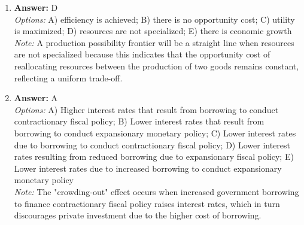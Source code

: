 \documentclass[12pt]{article}
\begin{document}
\begin{enumerate}[label=\arabic*.]
\item \textbf{Answer:} D
\\ \textit{Options:} A) efficiency is achieved; B) there is no opportunity cost; C) utility is maximized; D) resources are not specialized; E) there is economic growth
\\ \textit{Note:} A production possibility frontier will be a straight line when resources are not specialized because this indicates that the opportunity cost of reallocating resources between the production of two goods remains constant, reflecting a uniform trade-off.
\item \textbf{Answer:} A
\\ \textit{Options:} A) Higher interest rates that result from borrowing to conduct contractionary fiscal policy; B) Lower interest rates that result from borrowing to conduct expansionary monetary policy; C) Lower interest rates due to borrowing to conduct contractionary fiscal policy; D) Lower interest rates resulting from reduced borrowing due to expansionary fiscal policy; E) Lower interest rates due to increased borrowing to conduct expansionary monetary policy
\\ \textit{Note:} The "crowding-out" effect occurs when increased government borrowing to finance contractionary fiscal policy raises interest rates, which in turn discourages private investment due to the higher cost of borrowing.
\end{enumerate}
\end{document}

